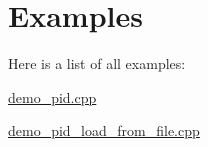 \section{Examples}
Here is a list of all examples\+:\begin{DoxyCompactItemize}
\item 
\hyperlink{demo_pid_8cpp-example}{demo\+\_\+pid.\+cpp}
\item 
\hyperlink{demo_pid_load_from_file_8cpp-example}{demo\+\_\+pid\+\_\+load\+\_\+from\+\_\+file.\+cpp}
\end{DoxyCompactItemize}
